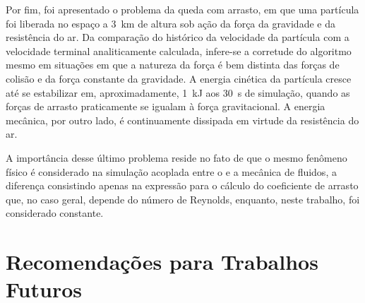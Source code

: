 Por fim, foi apresentado o problema da queda com arrasto, em que uma partícula foi liberada no espaço a \SI{3}{\kilo\meter} de altura sob ação da força da gravidade e da resistência do ar. Da comparação do histórico da velocidade da partícula com a velocidade terminal analiticamente calculada, infere-se a corretude do algoritmo mesmo em situações em que a natureza da força é bem distinta das forças de colisão e da força constante da gravidade. A energia cinética da partícula cresce até se estabilizar em, aproximadamente, \SI{1}{\kilo\joule} aos \SI{30}{\second} de simulação, quando as forças de arrasto praticamente se igualam à força gravitacional. A energia mecânica, por outro lado, é continuamente dissipada em virtude da resistência do ar.

A importância desse último problema reside no fato de que o mesmo fenômeno físico é considerado na simulação acoplada entre o \DEM{} e a mecânica de fluidos, a diferença consistindo apenas na expressão para o cálculo do coeficiente de arrasto que, no caso geral, depende do número de Reynolds, enquanto, neste trabalho, foi considerado constante.

\section{Recomendações para Trabalhos Futuros}

